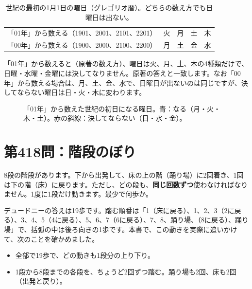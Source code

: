 \documentclass[a4paper,11pt,openany]{ltjsbook}
\begin{document}
\begin{table}[htbp]
\centering
\begin{tabular}{l|cccc}
\toprule
「01年」から数える（1901、2001、2101、2201） & 火 & 月 & 土 & 木\\
「00年」から数える（1900、2000、2100、2200） & 月 & 土 & 金 & 水\\
\bottomrule
\end{tabular}
\caption{世紀の最初の1月1日の曜日（グレゴリオ暦）。どちらの数え方でも日曜日は出ない。}
\end{table}

「01年」から数えると（原著の数え方）、曜日は火、月、土、木の4種類だけで、日曜・水曜・金曜には決してなりません。原著の答えと一致します。なお「00年」から数える場合は、月、土、金、水で、日曜日が出ないのは同じですが、決してならない曜日は日・火・木に変わります。

\begin{figure}[htbp]
\centering
{}
\caption{「01年」から数えた世紀の初日になる曜日。青：なる（月・火・木・土）。赤の斜線：決してならない（日・水・金）。}
\end{figure}

\section{第418問：階段のぼり}

8段の階段があります。下から出発して、床の上の階（踊り場）に2回着き、1回は下の階（床）に戻ります。ただし、どの段も、\textbf{同じ回数ずつ}使わなければなりません。1度に1段だけ動きます。最少で何歩か。

デュードニーの答えは19歩です。踏む順番は「1（床に戻る）、1、2、3（2に戻る）、3、4、5（4に戻る）、5、6、7（6に戻る）、7、8、踊り場、（8に戻る）、踊り場」で、括弧の中は後ろ向きの1歩です。本書で、この動きを実際に追いかけて、次のことを確かめました。

\begin{itemize}[leftmargin=*]
\item 全部で19歩で、どの動きも1段分の上り下り。
\item 1段から8段までの各段を、ちょうど2回ずつ踏む。踊り場も2回、床も2回（出発と戻り）。
\end{itemize}
\end{document}
